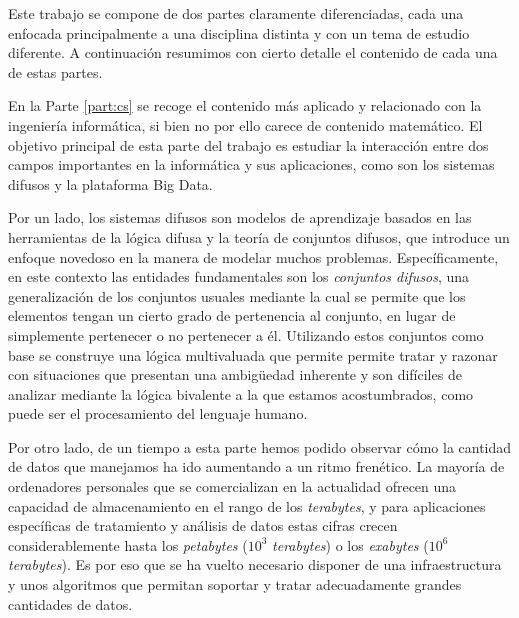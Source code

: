 %
%
%

Este trabajo se compone de dos partes claramente diferenciadas, cada una enfocada principalmente a una disciplina distinta y con un tema de estudio diferente. A continuación resumimos con cierto detalle el contenido de cada una de estas partes.

En la Parte \ref{part:cs} se recoge el contenido más aplicado y relacionado con la ingeniería informática, si bien no por ello carece de contenido matemático. El objetivo principal de esta parte del trabajo es estudiar la interacción entre dos campos importantes en la informática y sus aplicaciones, como son los sistemas difusos y la plataforma Big Data.

Por un lado, los sistemas difusos son modelos de aprendizaje basados en las herramientas de la lógica difusa y la teoría de conjuntos difusos, que introduce un enfoque novedoso en la manera de modelar muchos problemas. Específicamente, en este contexto las entidades fundamentales son los \textit{conjuntos difusos}, una generalización de los conjuntos usuales mediante la cual se permite que los elementos tengan un cierto grado de pertenencia al conjunto, en lugar de simplemente pertenecer o no pertenecer a él.
Utilizando estos conjuntos como base se construye una lógica multivaluada que permite permite tratar y razonar con situaciones que presentan una ambigüedad inherente y son difíciles de analizar mediante la lógica bivalente a la que estamos acostumbrados, como puede ser el procesamiento del lenguaje humano.

Por otro lado, de un tiempo a esta parte hemos podido observar cómo la cantidad de datos que manejamos ha ido aumentando a un ritmo frenético. La mayoría de ordenadores personales que se comercializan en la actualidad ofrecen una capacidad de almacenamiento en el rango de los \textit{terabytes}, y para aplicaciones específicas de tratamiento y análisis de datos estas cifras crecen considerablemente hasta los \textit{petabytes} ($10^3$ \textit{terabytes}) o los \textit{exabytes} ($10^6$ \textit{terabytes}). Es por eso que se ha vuelto necesario disponer de una infraestructura y unos algoritmos que permitan soportar y tratar adecuadamente grandes cantidades de datos.

